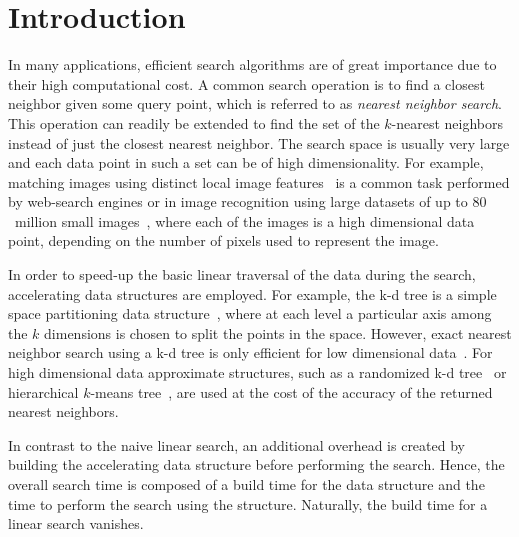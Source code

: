 \section{Introduction}
  \label{sec:intro}


   In many applications, efficient search algorithms are of 
  great importance due to their high computational cost.  A common search 
  operation is to find a closest neighbor given some query point, which is 
  referred to as \emph{nearest neighbor search}.  This operation can readily be 
  extended to find the set of the $k$-nearest neighbors instead of just the 
  closest nearest neighbor.  The search space is usually very large and each 
  data point in such a set can be of high dimensionality.  For example, 
  matching images using distinct local image features~\cite{lowe2004a} is 
  a common task performed by web-search engines or in image recognition using 
  large datasets of up to $80$~million small images~\cite{torralba2008a}, where 
  each of the images is a high dimensional data point, depending on the number 
  of pixels used to represent the image.

  In order to speed-up the basic linear traversal of the data during the 
  search, accelerating data structures are employed.  For example, the k-d tree 
  is a simple space partitioning data structure~\cite{bentley1975a,friedman1977a}, where at each level a particular axis among the $k$ dimensions is chosen to split the points in the space.  However, exact 
  nearest neighbor search using a k-d tree is only efficient for low dimensional 
  data~\cite{muja2009a}.  For high dimensional data approximate structures, 
  such as a randomized k-d tree~\cite{silpa2008a} or hierarchical $k$-means 
  tree~\cite{muja2009a}, are used at the cost of the accuracy of the returned 
  nearest neighbors.

  In contrast to the naive linear search, an additional overhead is created by 
  building the accelerating data structure before performing the search.  
  Hence, the overall search time is composed of a build time for the data 
  structure and the time to perform the search using the structure.  Naturally, 
  the build time for a linear search vanishes.

